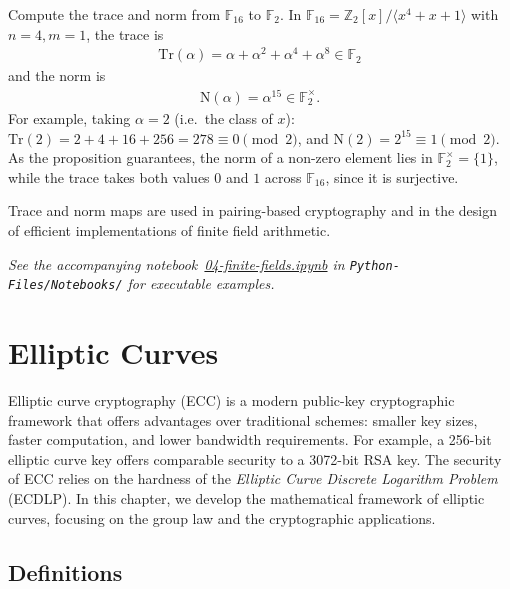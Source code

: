 \documentclass[a4paper, 12pt]{book} %
\newcommand{\notebook}[1]{\begingroup\small\itshape
    See the accompanying notebook~\href{run:./Python-Files/Notebooks/#1}{#1} in \texttt{Python-Files/Notebooks/} for executable examples.%
\endgroup}
\begin{document}
\begin{example}
    Compute the trace and norm from $\mathbb{F}_{16}$ to $\mathbb{F}_2$. In $\mathbb{F}_{16} = \mathbb{Z}_2[x]/\langle x^4 + x + 1\rangle$ with $n = 4, m = 1$, the trace is
    \begin{align}
        \mathrm{Tr}(\alpha) = \alpha + \alpha^2 + \alpha^4 + \alpha^8 \in \mathbb{F}_2
    \end{align}
    and the norm is
    \begin{align}
        \mathrm{N}(\alpha) = \alpha^{15} \in \mathbb{F}_2^\times.
    \end{align}
    For example, taking $\alpha = 2$ (i.e.\ the class of $x$): $\mathrm{Tr}(2) = 2 + 4 + 16 + 256 = 278 \equiv 0 \pmod 2$, and $\mathrm{N}(2) = 2^{15} \equiv 1 \pmod 2$. As the proposition guarantees, the norm of a non-zero element lies in $\mathbb{F}_2^\times = \{1\}$, while the trace takes both values $0$ and $1$ across $\mathbb{F}_{16}$, since it is surjective.
\end{example}

\begin{remark}
    Trace and norm maps are used in pairing-based cryptography and in the design of efficient implementations of finite field arithmetic.
\end{remark}

\notebook{04-finite-fields.ipynb}

\chapter{Elliptic Curves}
\label{ch:elliptic}

Elliptic curve cryptography (ECC) is a modern public-key cryptographic framework
that offers advantages over traditional schemes: smaller key sizes, faster
computation, and lower bandwidth requirements. For example, a 256-bit elliptic
curve key offers comparable security to a 3072-bit RSA key. The security of ECC
relies on the hardness of the \emph{Elliptic Curve Discrete Logarithm Problem}
(ECDLP). In this chapter, we develop the mathematical framework of elliptic
curves, focusing on the group law and the cryptographic applications.


\section{Definitions}
\end{document}
